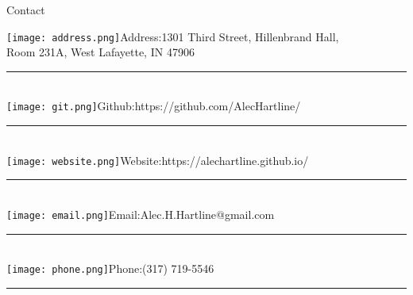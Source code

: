 \newcommand{\addressIcon}{\texttt{[image: address.png]}}%
\newcommand{\emailIcon}{\texttt{[image: email.png]}}%
\newcommand{\websiteIcon}{\texttt{[image: website.png]}}%
\newcommand{\phoneIcon}{\texttt{[image: phone.png]}}%
\newcommand{\gitIcon}{\texttt{[image: git.png]}}%
\newcommand{\separator}{\hspace{2.5cm}\rule[3pt]{5.5cm}{.5pt}\vspace{-5pt}\\}

\begin{center}
{\fontsize{24}{50}\selectfont Contact}\\
\end{center}
\vspace{-.9cm}
\begin{flushleft}
	\addressIcon Address:\hspace{.5cm}1301 Third Street, Hillenbrand Hall,\\
	\hspace{2.5cm}Room 231A, West Lafayette, IN 47906\\
	\separator
	\gitIcon Github:\hspace{0.7cm}https://github.com/AlecHartline/\\
	\separator
	\websiteIcon Website:\hspace{0.55cm}https://alechartline.github.io/\\
	\separator
	\emailIcon Email:\hspace{0.85cm}Alec.H.Hartline@gmail.com \\
	\separator
	\phoneIcon Phone:\hspace{0.8cm}(317) 719-5546\\
	\hspace{2.5cm}\rule[3pt]{7.5cm}{0pt}\\
\end{flushleft}